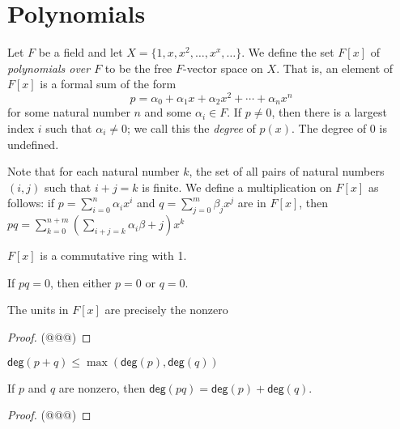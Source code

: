 \section{Polynomials}

\begin{dfn}
Let $F$ be a field and let $X = \{1,x,x^2,\ldots,x^x,\ldots\}$. We define the set $F[x]$ of \emph{polynomials over $F$} to be the free $F$-vector space on $X$. That is, an element of $F[x]$ is a formal sum of the form \[p = \alpha_0 + \alpha_1 x + \alpha_2 x^2 + \cdots + \alpha_n x^n\] for some natural number $n$ and some $\alpha_i \in F$. If $p \neq 0$, then there is a largest index $i$ such that $\alpha_i \neq 0$; we call this the \emph{degree} of $p(x)$. The degree of 0 is undefined.
\end{dfn}

Note that for each natural number $k$, the set of all pairs of natural numbers $(i,j)$ such that $i+j=k$ is finite. We define a multiplication on $F[x]$ as follows: if $p = \sum_{i=0}^n \alpha_i x^i$ and $q = \sum_{j=0}^m \beta_j x^j$ are in $F[x]$, then $pq = \sum_{k=0}^{n+m} (\sum_{i+j=k} \alpha_i \beta+j) x^k$

\begin{prp}
\begin{enumerate*}
\item $F[x]$ is a commutative ring with 1.
\item If $pq = 0$, then either $p = 0$ or $q = 0$.
\item The units in $F[x]$ are precisely the nonzero
\end{enumerate*}
\end{prp}

\begin{proof}
(@@@)
\end{proof}

\begin{prp}
\begin{enumerate*}
\item $\mathsf{deg}(p+q) \leq \max(\mathsf{deg}(p), \mathsf{deg}(q))$
\item If $p$ and $q$ are nonzero, then $\mathsf{deg}(pq) = \mathsf{deg}(p) + \mathsf{deg}(q)$.
\end{enumerate*}
\end{prp}

\begin{proof}
(@@@)
\end{proof}

